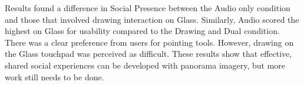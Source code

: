 Results found a difference in Social Presence between the Audio only condition and those that involved drawing interaction on Glass. Similarly, Audio scored the highest on Glass for usability compared to the Drawing and Dual condition. There was a clear preference from users for pointing tools. However, drawing on the Glass touchpad was perceived as difficult. These results show that effective, shared social experiences can be developed with panorama imagery, but more work still needs to be done.



